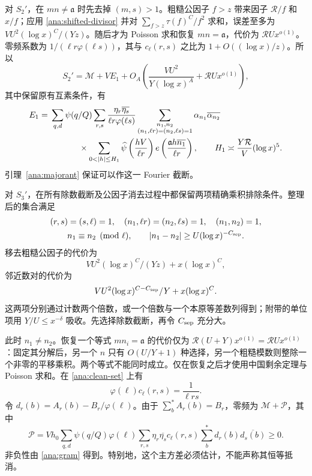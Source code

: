 对 $S_2'$，在 $mn\ne \mathfrak{a}$ 时先去掉 $(m,s)>1$。粗糙公因子 $f>z$ 带来因子 $\mathcal R/f$ 和 $x/f$；应用 \eqref{ana:shifted-divisor} 并对 $\sum_{f>z}\tau(f)^C/f^2$ 求和，误差至多为 $VU^2(\log x)^C/(Yz)$。随后才为 Poisson 求和恢复 $mn=\mathfrak{a}$，代价为 $\mathcal RUx^{o(1)}$。零频系数为 $1/(\ell r\varphi(\ell s))$，其与 $c_\ell(r,s)$ 之比为 $1+O((\log x)/z)$。所以
\begin{equation}
 S_2'=\mathcal M+VE_1+
 O_A\left(\frac{VU^2}{Y(\log x)^A}+\mathcal RUx^{o(1)}\right),
 \label{ana:cross}
\end{equation}
其中保留原有互素条件，有
\begin{align}
 E_1={}&\sum_{q,d}\psi(q/Q)\sum_{r,s}
     \frac{\eta_r\overline{\eta_s}}{\ell r\varphi(\ell s)}
 \sum_{\substack{n_1,n_2\\(n_1,\ell r)=(n_2,\ell s)=1}}
       \alpha_{n_1}\overline{\alpha_{n_2}}\notag\\
 &\hspace{12mm}\times
 \sum_{0<|h|\le H_1}\widehat\psi\left(\frac{hV}{\ell r}\right)
               e\left(\frac{\mathfrak{a}h\overline{n_1}}{\ell r}\right),
 \qquad H_1\asymp\frac{Y\mathcal R}{V}(\log x)^5.
 \label{ana:E1-definition}
\end{align}
引理~\ref{ana:majorant} 保证可以作这一 Fourier 截断。

对 $S_3'$，在所有除数截断及公因子消去过程中都保留两项精确乘积排除条件。整理后的集合满足
\begin{equation}
 \begin{gathered}
 (r,s)=(s,\ell)=1,\quad (n_1,\ell r)=(n_2,\ell s)=1,
 \quad(n_1,n_2)=1,\\
 n_1\equiv n_2\pmod\ell,\qquad
 |n_1-n_2|\ge U(\log x)^{-C_{\rm sep}}.
 \end{gathered}
 \label{ana:clean-set}
\end{equation}
移去粗糙公因子的代价为
\[
VU^2(\log x)^C/(Yz)+x(\log x)^C,
\]
邻近数对的代价为
\[
VU^2(\log x)^{C-C_{\rm sep}}/Y+x(\log x)^C.
\]
这两项分别通过计数两个倍数，或一个倍数与一个本原等差数列得到；附带的单位项用 $Y/U\le x^{-\delta}$ 吸收。先选择除数截断，再令 $C_{\rm sep}$ 充分大。

此时 $n_1\ne n_2$。恢复一个等式 $mn_i=\mathfrak{a}$ 的代价仅为 $\mathcal R(U+Y)x^{o(1)}=\mathcal RUx^{o(1)}$：固定其分解后，另一个 $n$ 只有 $O(U/Y+1)$ 种选择，另一个粗糙模数则整除一个非零的平移乘积。两个等式不能同时成立。仅在恢复之后才使用中国剩余定理与 Poisson 求和。在 \eqref{ana:clean-set} 上有
\[
 \varphi(\ell)c_\ell(r,s)=\frac1{\ell rs}.
\]
令 $d_r(b)=A_r(b)-B_r/\varphi(\ell)$。由于 $\sum_b^*A_r(b)=B_r$，零频为 $\mathcal M+\mathcal P$，其中
\begin{equation}
 \mathcal P=Vh_0\sum_{q,d}\psi(q/Q)\varphi(\ell)
   \sum_{r,s}\eta_r\overline{\eta_s}c_\ell(r,s)
                     \sum_b^*d_r(b)\overline{d_s(b)}\ge0.
 \label{ana:principal-variance}
\end{equation}
非负性由 \eqref{ana:gram} 得到。特别地，这个主方差必须估计，不能声称其恒等抵消。

